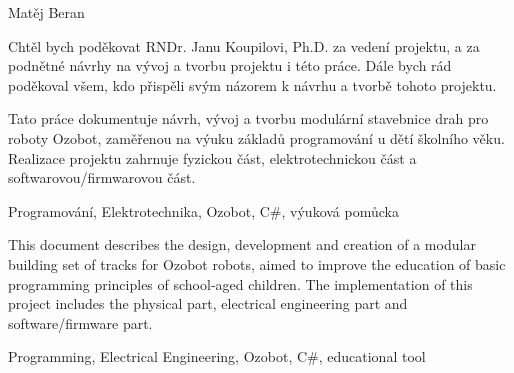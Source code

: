 \documentclass[12pt]{book}
\begin{document}
\hspace{6cm} Matěj Beran
\newpage
\thispagestyle{empty}

\noindent Chtěl bych poděkovat RNDr. Janu Koupilovi, Ph.D. za vedení projektu, a za podnětné návrhy na vývoj a tvorbu projektu i této práce. Dále bych rád poděkoval všem, kdo přispěli svým názorem k návrhu a tvorbě tohoto projektu.
\newpage
\thispagestyle{empty}

\noindent Tato práce dokumentuje návrh, vývoj a tvorbu modulární stavebnice drah pro roboty Ozobot, zaměřenou na výuku základů programování u dětí školního věku. Realizace projektu zahrnuje fyzickou část, elektrotechnickou část a softwarovou/firmwarovou část. 


\noindent Programování, Elektrotechnika, Ozobot, C\#, výuková pomůcka


\noindent This document describes the design, development and creation of a modular building set of tracks for Ozobot robots, aimed to improve the education of basic programming principles of school-aged children. The implementation of this project includes the physical part, electrical engineering part and software/firmware part.


\noindent Programming, Electrical Engineering, Ozobot, C\#, educational tool

\newpage
\thispagestyle{empty}
\tableofcontents
\thispagestyle{empty}



\end{document}
